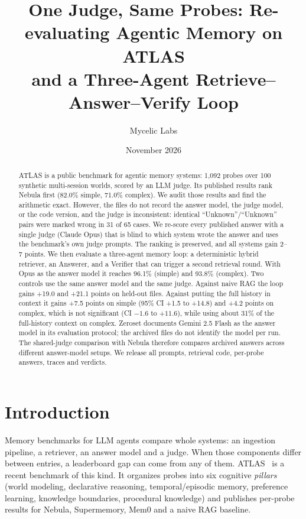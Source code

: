 \documentclass[11pt]{article}
\title{One Judge, Same Probes: Re-evaluating Agentic Memory on ATLAS\\
and a Three-Agent Retrieve--Answer--Verify Loop}
\author{Mycelic Labs}
\date{November 2026}
\begin{document}
\maketitle

\begin{abstract}
ATLAS is a public benchmark for agentic memory systems: 1{,}092 probes over 100 synthetic multi-session worlds, scored by an LLM judge. Its published results rank Nebula first (82.0\% simple, 71.0\% complex). We audit those results and find the arithmetic exact. However, the files do not record the answer model, the judge model, or the code version, and the judge is inconsistent: identical ``Unknown''/``Unknown'' pairs were marked wrong in 31 of 65 cases. We re-score every published answer with a single judge (Claude Opus) that is blind to which system wrote the answer and uses the benchmark's own judge prompts. The ranking is preserved, and all systems gain 2--7 points. We then evaluate a three-agent memory loop: a deterministic hybrid retriever, an Answerer, and a Verifier that can trigger a second retrieval round. With Opus as the answer model it reaches 96.1\% (simple) and 93.8\% (complex). Two controls use the same answer model and the same judge. Against naive RAG the loop gains +19.0 and +21.1 points on held-out files. Against putting the full history in context it gains +7.5 points on simple (95\% CI +1.5 to +14.8) and +4.2 points on complex, which is not significant (CI $-1.6$ to $+11.6$), while using about 31\% of the full-history context on complex. Zeroset documents Gemini 2.5 Flash as the answer model in its evaluation protocol; the archived files do not identify the model per run. The shared-judge comparison with Nebula therefore compares archived answers across different answer-model setups. We release all prompts, retrieval code, per-probe answers, traces and verdicts.
\end{abstract}

\section{Introduction}
Memory benchmarks for LLM agents compare whole systems: an ingestion pipeline, a retriever, an answer model and a judge. When those components differ between entries, a leaderboard gap can come from any of them. ATLAS~\citep{atlas2026} is a recent benchmark of this kind. It organizes probes into six cognitive \emph{pillars} (world modeling, declarative reasoning, temporal/episodic memory, preference learning, knowledge boundaries, procedural knowledge) and publishes per-probe results for Nebula, Supermemory, Mem0 and a naive RAG baseline.
\end{document}
